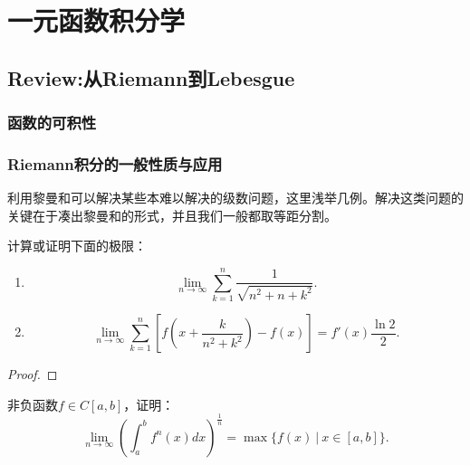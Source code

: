\chapter{一元函数积分学}
    \section{Review:从Riemann到Lebesgue}
    \subsection{函数的可积性}
    \subsection{Riemann积分的一般性质与应用}
    利用黎曼和可以解决某些本难以解决的级数问题，这里浅举几例。解决这类问题的关键在于凑出黎曼和的形式，并且我们一般都取等距分割。
    \begin{example}
        计算或证明下面的极限：
        \begin{enumerate}
            \item $$\lim\limits_{n\rightarrow\infty}\sum_{k=1}^{n}\frac{1}{\sqrt{n^2+n+k^2}}.$$
            \item $$\lim\limits_{n\rightarrow\infty}\sum_{k=1}^{n}\left[f(x+\frac{k}{n^2+k^2})-f(x)\right]=f'(x)\frac{\ln 2}{2}.$$
        \end{enumerate}
    \end{example}
    \begin{proof}
        
    \end{proof}
    \begin{example}
        非负函数$f\in C\left[a,b\right]$，证明：$$\lim\limits_{n\rightarrow\infty}\left(\int_{a}^{b}f^{n}(x)dx\right)^{\frac{1}{n}}=\max\{f(x)\ |\ x\in\left[a,b\right]\}.$$
    \end{example}
